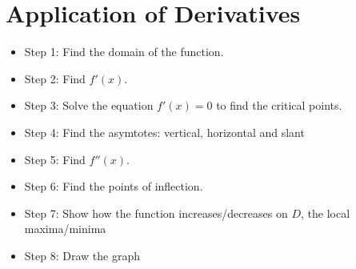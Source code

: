 \chapter{Application of Derivatives}

    \begin{itemize}
        \item Step 1: Find the domain of the function.
        \item Step 2: Find $f'(x)$.
        \item Step 3: Solve the equation $f'(x) = 0$ to find the critical points.
        \item Step 4: Find the asymtotes: vertical, horizontal and slant
        \item Step 5: Find $f''(x)$.
        \item Step 6: Find the points of inflection.
        \item Step 7: Show how the function increases/decreases on $D$, the local
            maxima/minima
        \item Step 8: Draw the graph
    \end{itemize}
